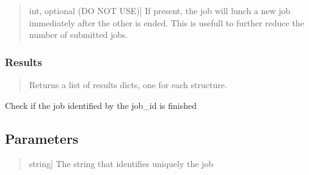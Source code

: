 \documentclass[a4paper,11pt,english]{sphinxmanual}
\begin{document}
\begin{fulllineitems}
\begin{fulllineitems}
\begin{quote}
\begin{description}
\sphinxlineitem{n\_togheder}{[}int, optional (DO NOT USE){]}
\sphinxAtStartPar
If present, the job will lunch a new job immediately after the other 
is ended. This is usefull to further reduce the number of submitted 
jobs.

\end{description}
\end{quote}


\subsubsection{Results}
\label{\detokenize{apireference:id51}}\begin{quote}
\begin{description}
\sphinxAtStartPar
Returns a list of results dicts, one for each structure.

\end{description}
\end{quote}

\end{fulllineitems}


\begin{fulllineitems}
\label{\detokenize{apireference:sscha.Cluster.Cluster.check_job_finished}}
\pysigstartsignatures
{}
\pysigstopsignatures
\sphinxAtStartPar
Check if the job identified by the job\_id is finished


\subsection{Parameters}
\label{\detokenize{apireference:id52}}\begin{quote}
\begin{description}
\sphinxlineitem{job\_id}{[}string{]}
\sphinxAtStartPar
The string that identifies uniquely the job

\end{description}
\end{quote}

\end{fulllineitems}



\end{fulllineitems}
\end{document}
